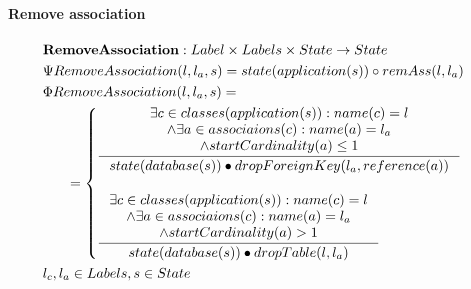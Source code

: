 \documentclass[11pt]{article}
\begin{document}
\paragraph{Remove association} 
\begin{align*}
&    \mathbf{RemoveAssociation} : Label \times Labels \times State \rightarrow State \\ 
&    \Psi RemoveAssociation(l, l_a, s) = state(application(s)) \circ remAss(l, l_a) \\
&    \Phi RemoveAssociation(l, l_a, s) = \\
& \;\;\;\;\;\; =\begin{cases}
     	\inference{\exists c \in classes(application(s)) : name(c) = l \\
     	\wedge \exists a \in associaions(c) : name(a) = l_a  \\
     	\wedge startCardinality(a) \leq 1 \\}{state(database(s)) \bullet dropForeignKey(l_a, reference(a))} \\\\
     	\inference{\exists c \in classes(application(s)) : name(c) = l \\
     	\wedge \exists a \in associaions(c) : name(a) = l_a  \\
     	\wedge startCardinality(a) > 1}{state(database(s)) \bullet dropTable(l, l_a)} 
     \end{cases}\\
&    l_c, l_a \in Labels, s \in State
\end{align*}
\end{document}

